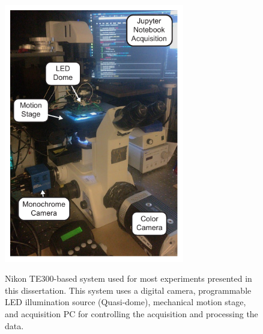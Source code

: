 \begin{figure}[bh]
    \centering
    \includegraphics[width=0.7\textwidth]{figures/fig_intro_dome_system.pdf}
    \label{fig:intro_system_dome}
    \caption{Nikon TE300-based system used for most experiments presented in this dissertation. This system uses a digital camera, programmable LED illumination source (Quasi-dome), mechanical motion stage, and acquisition PC for controlling the acquisition and processing the data.}
\end{figure}
